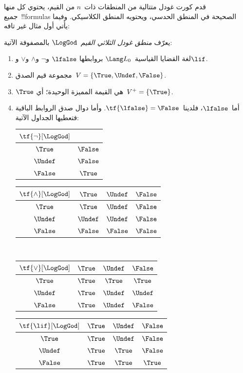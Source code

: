 \documentclass[../../../include/open-logic-section]{subfiles}
\begin{document}


قدم كورت غودل متتالية من المنطقات ذات~$n$ من القيم، يحتوي كل منها
جميع~!!{formula}s الصحيحة في المنطق الحدسي، ويحتويه المنطق الكلاسيكي.
وفيما يأتي أول مثال غير تافه:

\begin{defn}
يعرّف \emph{منطق غودل الثلاثي القيم}~$\LogGod$ بالمصفوفة الآتية:
\begin{enumerate}
  \item لغة القضايا القياسية~$\Lang L_0$ بروابطها
  $\lfalse$ و$\lnot$ و$\land$ و$\lor$ و$\lif$.
  \item مجموعة قيم الصدق~$V = \{\True, \Undef, \False\}$.
  \item $\True$ هي القيمة المميزة الوحيدة؛ أي~$V^+ = \{\True\}$.
  \item أما~$\lfalse$، فلدينا~$\tf{\lfalse} = \False$. وأما دوال
  صدق الروابط الباقية فتعطيها الجداول الآتية:
  \begin{center}
    \begin{tabular}{c|c}
      $\tf{\lnot}[\LogGod]$ & \\
      \hline
      $\True$ & $\False$ \\
      $\Undef$ & $\False$ \\
      $\False$ & $\True$
    \end{tabular}
    \quad
    \begin{tabular}{c|ccc}
      $\tf{\land}[\LogGod]$ & $\True$ & $\Undef$ & $\False$ \\
      \hline
      $\True$ & $\True$ & $\Undef$ & $\False$ \\
      $\Undef$ & $\Undef$ & $\Undef$ & $\False$\\
      $\False$ & $\False$ & $\False$ & $\False$
    \end{tabular}
    \\[2ex]
    \begin{tabular}{c|ccc}
      $\tf{\lor}[\LogGod]$ & $\True$ & $\Undef$ & $\False$ \\
      \hline
      $\True$ & $\True$ & $\True$ & $\True$ \\
      $\Undef$ & $\True$ & $\Undef$ & $\Undef$ \\
      $\False$ & $\True$ & $\Undef$ & $\False$
    \end{tabular}
    \quad
    \begin{tabular}{c|ccc}
      $\tf{\lif}[\LogGod]$ & $\True$ & $\Undef$ & $\False$ \\
      \hline
      $\True$ & $\True$ & $\Undef$ & $\False$ \\
      $\Undef$ & $\True$ & $\True$ & $\False$  \\
      $\False$ & $\True$ & $\True$ & $\True$
    \end{tabular}
  \end{center}
\end{enumerate}
\end{defn}
\end{document}
